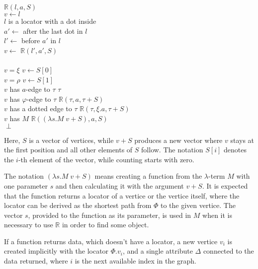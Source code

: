 \begin{twocols}
\begin{algo}
 $\mathbb{R}(l,a,S)$ \\
  \tab $v \gets l$ \\
  \tab {} $l$ is a locator with a dot inside \\
  \tab\tab $a' \gets$ after the last dot in $l$ \\
  \tab\tab $l' \gets$ before $a'$ in $l$ \\
  \tab\tab $v \gets$ $\mathbb{R}(l', a', S)$ \\
  \tab {} \\
  \tab {} $v = \xi$  $v \gets S[0]$ \\
  \tab {} $v = \rho$  $v \gets S[1]$ \\
  \tab {} $v$ has $a$-edge to $\tau$   $\tau$ \\
  \tab {} $v$ has $\varphi$-edge to $\tau$   $\mathbb{R}(\tau, a, \tau + S)$ \\
  \tab {} $v$ has a dotted edge to $\tau$   $\mathbb{R}(\tau, \xi.a, \tau + S)$ \\
  \tab {} $v$ has $M$   $\mathbb{R}((\lambda s.M \; v + S), a, S)$ \\
  \tab {} $\perp$ \\
\end{algo}
\end{twocols}

Here, $S$ is a vector of vertices, while $v+S$ produces a new vector
where $v$ stays at the first position and all other elements of $S$ follow.
The notation $S[i]$ denotes the $i$-th element of the vector, while
counting starts with zero.

The notation $(\lambda s.M \; v + S)$ means creating a function from
the $\lambda$-term $M$ with one parameter $s$ and then calculating
it with the argument $v + S$.
It is expected that the function returns a locator of a vertice or
the vertice itself, where the locator can be derived as
the shortest path from $\Phi$ to the given vertice.
The vector $s$, provided to the
function as its parameter, is used in $M$ when it is necessary
to use $\mathbb{R}$ in order to find some object.

If a function returns data, which doesn't have a locator, a new vertice
$v_i$ is created implicitly with the locator $\Phi.v_i$, and
a single attribute $\Delta$ connected to the data returned, where
$i$ is the next available index in the graph.

